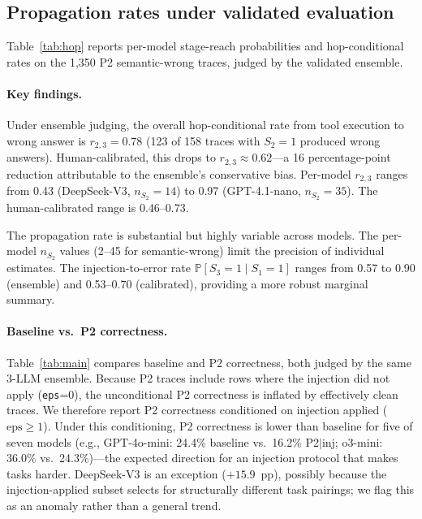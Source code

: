 \documentclass[preprint,review,12pt,3p]{elsarticle}
\renewcommand{\Pr}{\mathbb{P}}
\begin{document}
\subsection{Propagation rates under validated evaluation}
\label{sec:propagation}

Table~\ref{tab:hop} reports per-model stage-reach probabilities and
hop-conditional rates on the 1{,}350 P2 semantic-wrong traces, judged
by the validated ensemble.



\paragraph{Key findings.}
Under ensemble judging, the overall hop-conditional rate from tool
execution to wrong answer is $r_{2,3} = 0.78$ (123 of 158 traces with
$S_2{=}1$ produced wrong answers).
Human-calibrated, this drops to $r_{2,3} \approx 0.62$---a 16
percentage-point reduction attributable to the ensemble's conservative
bias.
Per-model $r_{2,3}$ ranges from 0.43 (DeepSeek-V3, $n_{S_2}{=}14$)
to 0.97 (GPT-4.1-nano, $n_{S_2}{=}35$).
The human-calibrated range is 0.46--0.73.

The propagation rate is substantial but highly variable across models.
The per-model $n_{S_2}$ values (2--45 for semantic-wrong) limit the
precision of individual estimates.
The injection-to-error rate $\Pr[S_3{=}1 \mid S_1{=}1]$ ranges from
0.57 to 0.90 (ensemble) and 0.53--0.70 (calibrated), providing a more
robust marginal summary.

\paragraph{Baseline vs.\ P2 correctness.}
Table~\ref{tab:main} compares baseline and P2 correctness, both judged
by the same 3-LLM ensemble.
Because P2 traces include rows where the injection did not apply
(\texttt{eps}{=}0), the unconditional P2 correctness is inflated by
effectively clean traces.
We therefore report P2 correctness conditioned on injection applied
($\text{eps}{\geq}1$).
Under this conditioning, P2 correctness is lower than baseline for
five of seven models (e.g., GPT-4o-mini: 24.4\% baseline vs.\
16.2\% P2$|$inj; o3-mini: 36.0\% vs.\ 24.3\%)---the expected
direction for an injection protocol that makes tasks harder.
DeepSeek-V3 is an exception ($+15.9$~pp), possibly because the
injection-applied subset selects for structurally different task
pairings; we flag this as an anomaly rather than a general trend.
\end{document}
